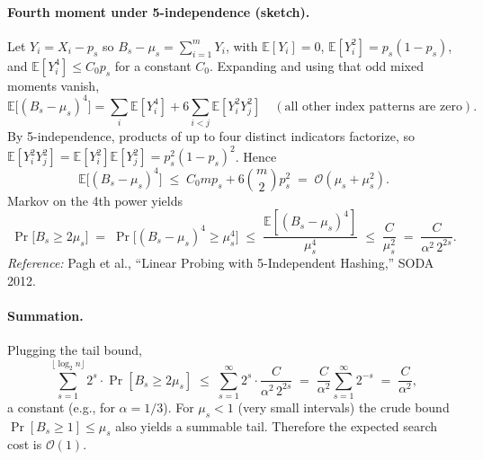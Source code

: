 \paragraph{Fourth moment under 5-independence (sketch).}
Let $Y_i=X_i-p_s$ so $B_s-\mu_s=\sum_{i=1}^m Y_i$, with $\mathbb{E}[Y_i]=0$, $\mathbb{E}[Y_i^2]=p_s(1-p_s)$, and $\mathbb{E}[Y_i^4]\le C_0 p_s$ for a constant $C_0$.
Expanding and using that odd mixed moments vanish,
\[
\mathbb{E}\big[(B_s-\mu_s)^4\big]
= \sum_i \mathbb{E}[Y_i^4] + 6\!\!\sum_{i<j}\! \mathbb{E}[Y_i^2 Y_j^2]
\quad(\text{all other index patterns are zero}).
\]
By 5-independence, products of up to four distinct indicators factorize, so
$\mathbb{E}[Y_i^2 Y_j^2]=\mathbb{E}[Y_i^2]\mathbb{E}[Y_j^2]=p_s^2(1-p_s)^2$.
Hence
\[
\mathbb{E}\big[(B_s-\mu_s)^4\big]
\;\le\; C_0 m p_s + 6\binom{m}{2}p_s^2
\;=\; \mathcal{O}(\mu_s+\mu_s^2).
\]
Markov on the 4th power yields
\[
\Pr\!\big[B_s\ge 2\mu_s\big] \;=\; \Pr\!\big[(B_s-\mu_s)^4\ge \mu_s^4\big]
\;\le\; \frac{\mathbb{E}[(B_s-\mu_s)^4]}{\mu_s^4}
\;\le\; \frac{C}{\mu_s^2}
\;=\; \frac{C}{\alpha^2\,2^{2s}}.
\]
\emph{Reference:} Pagh et al., “Linear Probing with 5-Independent Hashing,” SODA 2012.

\paragraph{Summation.}
Plugging the tail bound,
\[
\sum_{s=1}^{\lfloor\log_2 n\rfloor} 2^s \cdot \Pr[B_s \ge 2\mu_s]
\;\le\; \sum_{s=1}^{\infty} 2^s \cdot \frac{C}{\alpha^2\,2^{2s}}
\;=\; \frac{C}{\alpha^2}\sum_{s=1}^{\infty} 2^{-s}
\;=\; \frac{C}{\alpha^2},
\]
a constant (e.g., for $\alpha=1/3$). For $\mu_s<1$ (very small intervals) the crude bound
$\Pr[B_s\ge 1]\le \mu_s$ also yields a summable tail. Therefore the expected search cost is $\mathcal{O}(1)$.
